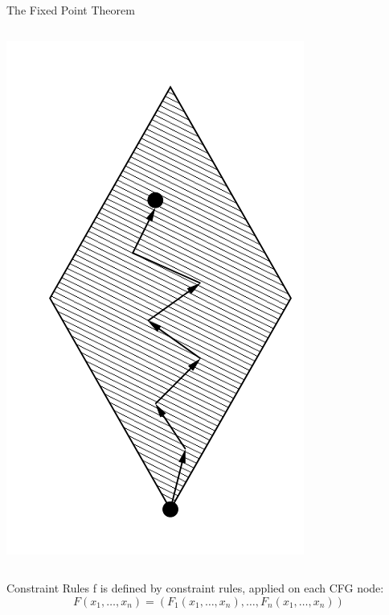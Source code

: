 \begin{frame}{The Fixed Point Theorem}
\begin{columns}[c]
    \begin{column}{0.2\textwidth}
      \includegraphics[width=\textwidth]{graphics/fixed-point_walk}
    \end{column}
  \end{columns}
\end{frame}

\begin{frame}{Constraint Rules}{}
  f is defined by constraint rules, applied on each CFG node:
  \[ F(x_1, \dots, x_n) = (F_1(x_1, \dots, x_n), \dots, F_n(x_1, \dots, x_n)) \]
\end{frame}


